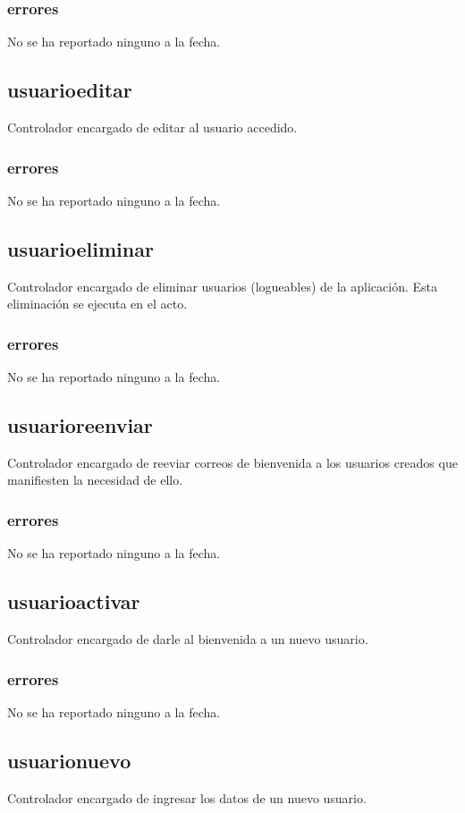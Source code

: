 \documentclass[10pt,a4paper]{book}
\begin{document}
	\subsubsection{errores}
	No se ha reportado ninguno a la fecha.
	
	\subsection{usuarioeditar}
	Controlador encargado de editar al usuario accedido.
	\subsubsection{errores}
	No se ha reportado ninguno a la fecha.

	\subsection{usuarioeliminar}
	Controlador encargado de eliminar usuarios (logueables) de la aplicación. Esta eliminación se ejecuta en el acto.
	\subsubsection{errores}
	No se ha reportado ninguno a la fecha.

	\subsection{usuarioreenviar}
	Controlador encargado de reeviar correos de bienvenida a los usuarios creados que manifiesten la necesidad de ello.
	\subsubsection{errores}
	No se ha reportado ninguno a la fecha.

	\subsection{usuarioactivar}
	Controlador encargado de darle al bienvenida a un nuevo usuario.
	\subsubsection{errores}
	No se ha reportado ninguno a la fecha.
	
	\subsection{usuarionuevo}
	Controlador encargado de ingresar los datos de un nuevo usuario.
\end{document}

